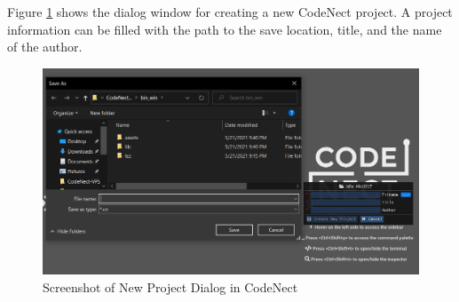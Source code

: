 \parx
Figure \ref{fig:cn_new_project} shows the dialog window for creating a new CodeNect
project. A project information can be filled with the path to the save
location, title, and the name of the author.

\begin{figure}[H]
	\centering
	\captionsetup{justification=centering}
	\captionsetup[figure]{list=yes}
	\includegraphics[width=\linewidth]{media/sc_new_project.png}
	\caption[Screenshot of New Project Dialog in CodeNect]{Screenshot of New Project Dialog in CodeNect}
	\label{fig:cn_new_project}
\end{figure}
